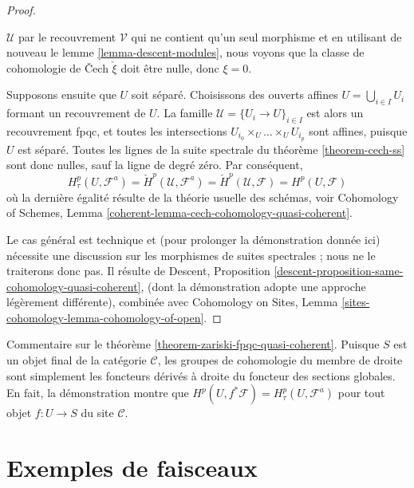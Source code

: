 \begin{proof}
\begin{enumerate}
$\mathcal{U}$ par le recouvrement $\mathcal{V}$ qui ne contient qu'un seul morphisme
et en utilisant de nouveau le lemme \ref{lemma-descent-modules},
nous voyons que la classe de cohomologie de {\v C}ech $\check \xi$ doit \^etre nulle,
donc $\xi = 0$.
\end{enumerate}
Supposons ensuite que $U$ soit s\'epar\'e. Choisissons des ouverts affines
$U = \bigcup_{i \in I} U_i$ formant un recouvrement de $U$. La famille
$\mathcal{U} = \{U_i \to U\}_{i \in I}$ est alors un recouvrement fpqc,
et toutes les intersections
$U_{i_0} \times_U \ldots \times_U U_{i_p}$ sont affines,
puisque $U$ est s\'epar\'e. Toutes les lignes de la suite spectrale du
th\'eor\`eme \ref{theorem-cech-ss}
sont donc nulles, sauf la ligne de degr\'e z\'ero. Par cons\'equent,
$$
H^p_\tau(U, \mathcal{F}^a) =
\check H^p(\mathcal{U}, \mathcal{F}^a) =
\check H^p(\mathcal{U}, \mathcal{F}) = H^p(U, \mathcal{F})
$$
o\`u la derni\`ere \'egalit\'e r\'esulte de la th\'eorie usuelle des sch\'emas, voir
Cohomology of Schemes, Lemma
\ref{coherent-lemma-cech-cohomology-quasi-coherent}.

\medskip\noindent
Le cas g\'en\'eral est technique et (pour prolonger la d\'emonstration donn\'ee ici)
n\'ecessite une discussion sur les morphismes de suites spectrales ; nous ne le traiterons donc pas.
Il r\'esulte de
Descent, Proposition \ref{descent-proposition-same-cohomology-quasi-coherent},
(dont la d\'emonstration adopte une approche l\'eg\`erement diff\'erente), combin\'ee avec
Cohomology on Sites, Lemma \ref{sites-cohomology-lemma-cohomology-of-open}.
\end{proof}

\begin{remark}
\label{remark-right-derived-global-sections}
Commentaire sur le th\'eor\`eme \ref{theorem-zariski-fpqc-quasi-coherent}.
Puisque $S$ est un objet final de la cat\'egorie $\mathcal{C}$, les groupes de cohomologie
du membre de droite sont simplement les foncteurs d\'eriv\'es \`a droite du
foncteur des sections globales. En fait, la d\'emonstration montre que
$H^p(U, f^*\mathcal{F}) = H^p_\tau(U, \mathcal{F}^a)$
pour tout objet $f : U \to S$ du site $\mathcal{C}$.
\end{remark}





\section{Exemples de faisceaux}
\label{section-examples-sheaves}

